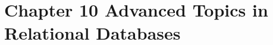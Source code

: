 \documentclass[../../main.tex]{subfiles}
\begin{document}
\section{Chapter 10 Advanced Topics in Relational Databases}








\end{document}
